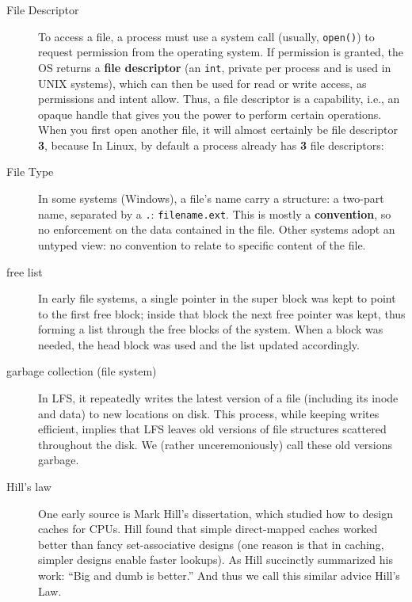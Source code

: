 \begin{description}
\item[File Descriptor] To access a file, a process must use a system call (usually, \texttt{open()}) to request permission from the operating system. If permission is granted, the OS returns a \textbf{file descriptor} (an \texttt{int}, private per process and is used in UNIX systems), which can then be used for read or write access, as permissions and intent allow.  Thus, a file descriptor is a capability, i.e., an opaque handle that gives you the power to perform certain operations.  When you first open another file, it will almost certainly be file descriptor \textbf{3}, because In Linux, by default a process already has \textbf{3} file descriptors:


\item[File Type]  In some systems (Windows), a file's name carry a structure: a two-part name, separated by a \texttt{.}: \texttt{filename.ext}. This is mostly a \textbf{convention}, so no enforcement on the data contained in the file. Other systems adopt an untyped view: no convention to relate to specific content of the file.

\item[free list] In early file systems, a single pointer in the super block was kept to point to the first free block; inside that block the next free pointer was kept, thus forming a list through the free blocks of the system. When a block was needed, the head block was used and the list updated accordingly.

\item[garbage collection (file system)] In LFS, it repeatedly writes the latest version of a file (including its inode and data) to new locations on disk. This process, while keeping writes efficient, implies that LFS leaves old versions of file structures scattered throughout the disk. We (rather unceremoniously) call these old versions garbage.

\item[Hill's law] One early source is Mark Hill's dissertation, which studied how to design caches for CPUs. Hill found that simple direct-mapped caches worked better than fancy set-associative designs (one reason is that in caching, simpler designs enable faster lookups). As Hill succinctly summarized his work: ``Big and dumb is better.'' And thus we call this similar advice Hill's Law.


\end{description}
